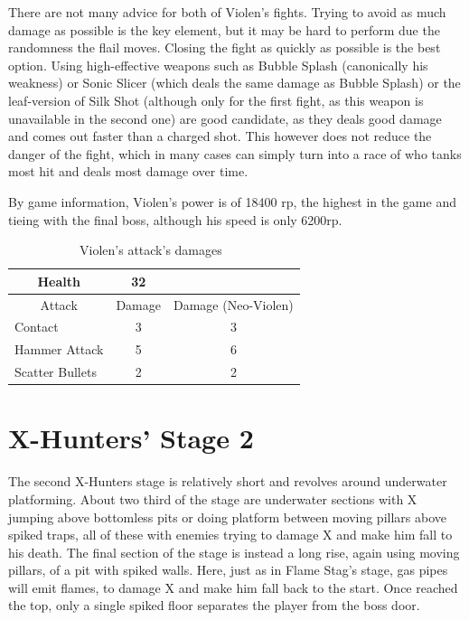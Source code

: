 There are not many advice for both of Violen's fights. Trying to avoid as much damage as possible is the key element, but it may be hard to perform due the randomness the flail moves. Closing the fight as quickly as possible is the best option. Using high-effective weapons such as Bubble Splash (canonically his weakness) or Sonic Slicer (which deals the same damage as Bubble Splash) or the leaf-version of Silk Shot (although only for the first fight, as this weapon is unavailable in the second one) are good candidate, as they deals good damage and comes out faster than a charged shot. This however does not reduce the danger of the fight, which in many cases can simply turn into a race of who tanks most hit and deals most damage over time.

By game information, Violen's power is of 18400 rp, the highest in the game and tieing with the final boss, although his speed is only 6200rp.

\begin{table}[htp]
	\centering
	\begin{tabular}[h]{l c c}
		\toprule
		\multicolumn{1}{c}{Health}  & 32 &\\
		\midrule
		\multicolumn{1}{c}{Attack} & \multicolumn{1}{c}{Damage}& \multicolumn{1}{c}{Damage (Neo-Violen)}\\
		Contact & 3 & 3\\
		Hammer Attack & 5& 6\\
		Scatter Bullets & 2& 2\\
		\bottomrule
	\end{tabular}
	\caption{Violen's attack's damages~\cite{wiki:Violen}}
\end{table}

\section{X-Hunters' Stage 2}
The second X-Hunters stage  is relatively short and revolves around underwater platforming. About two third of the stage are underwater sections with X jumping above bottomless pits or doing platform between moving pillars above spiked traps, all of these with enemies trying to damage X and make him fall to his death. The final section of the stage is instead a long rise, again using moving pillars, of a pit with spiked walls. Here, just as in Flame Stag's stage, gas pipes will emit flames, to damage X and make him fall back to the start. Once reached the top, only a single spiked floor separates the player from the boss door. 

